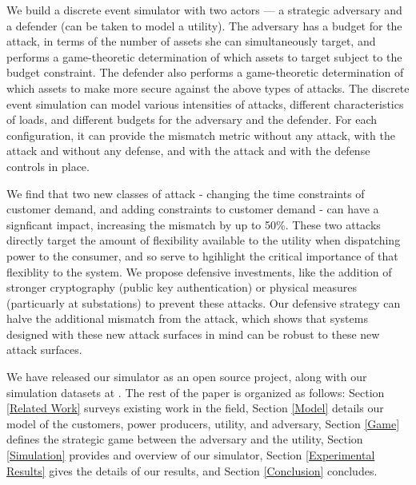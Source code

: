 \documentclass[conference]{IEEEtran}
\begin{document}
We build a discrete event simulator with two actors --- a strategic adversary and a defender (can be taken to model a utility). The adversary has a budget for the attack, in terms of the number of assets she can simultaneously target, and performs a game-theoretic determination of which assets to target subject to the budget constraint. The defender also performs a game-theoretic determination of which assets to make more secure against the above types of attacks. The discrete event simulation can model various intensities of attacks, different characteristics of loads, and different budgets for the adversary and the defender. For each configuration, it can provide the mismatch metric without any attack, with the attack and without any defense, and with the attack and with the defense controls in place. 

We find that two new classes of attack - changing the time constraints of customer demand, and adding constraints to customer demand - can have a signficant impact, increasing the mismatch by up to 50\%.  These two attacks directly target the amount of flexibility available to the utility when dispatching power to the consumer, and so serve to hgihlight the critical importance of that flexiblity to the system.  We propose defensive investments, like the addition of stronger cryptography (public key authentication) or physical measures (particuarly at substations) to prevent these attacks.  Our defensive strategy can halve the additional mismatch from the attack, which shows that systems designed with these new attack surfaces in mind can be robust to these new attack surfaces.  

We have released our simulator as an open source project, along with our simulation datasets at \cite{gridsec}.  The rest of the paper is organized as follows: Section \ref{Related Work} surveys existing work in the field, Section \ref{Model} details our model of the customers, power producers, utility, and adversary, Section \ref{Game} defines the strategic game between the adversary and the utility, Section \ref{Simulation} provides and overview of our simulator, Section \ref{Experimental Results} gives the details of our results, and Section \ref{Conclusion} concludes.

\end{document}
